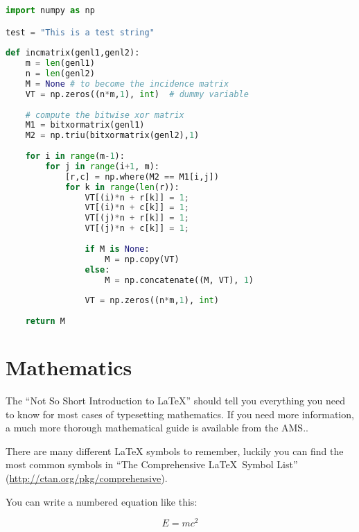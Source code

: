 \begin{lstlisting}[language=Python,float=t,
  caption={This is an example of syntax highlighting of
  Python code with a relatively long caption},label={lst:listing}]
import numpy as np

test = "This is a test string"
 
def incmatrix(genl1,genl2):
    m = len(genl1)
    n = len(genl2)
    M = None # to become the incidence matrix
    VT = np.zeros((n*m,1), int)  # dummy variable
 
    # compute the bitwise xor matrix
    M1 = bitxormatrix(genl1)
    M2 = np.triu(bitxormatrix(genl2),1) 
 
    for i in range(m-1):
        for j in range(i+1, m):
            [r,c] = np.where(M2 == M1[i,j])
            for k in range(len(r)):
                VT[(i)*n + r[k]] = 1;
                VT[(i)*n + c[k]] = 1;
                VT[(j)*n + r[k]] = 1;
                VT[(j)*n + c[k]] = 1;
 
                if M is None:
                    M = np.copy(VT)
                else:
                    M = np.concatenate((M, VT), 1)
 
                VT = np.zeros((n*m,1), int)
 
    return M
\end{lstlisting}


\section{Mathematics}

The \enquote{Not So Short Introduction to LaTeX} should tell you everything you need to know for most cases of typesetting mathematics. If you need more information, a much more thorough mathematical guide is available from the AMS..

There are many different LaTeX symbols to remember, luckily you can find the most common symbols in ``The Comprehensive \LaTeX~Symbol List'' (\url{http://ctan.org/pkg/comprehensive}).

You can write a numbered equation like this:
\begin{latex}
\begin{equation}
E = mc^{2}
\label{eqn:Einstein}
\end{equation}
\end{latex}

